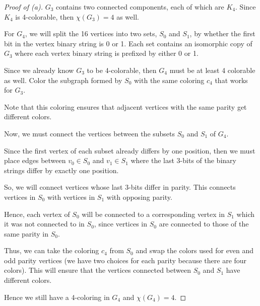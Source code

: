 \documentclass[../hw7]{subfiles}
\begin{document}
\begin{proof}[Proof of (a)]
	$G_3$ contains two connected components, each of which are $K_4$.
	Since $K_4$ is 4-colorable, then $\chi(G_3)=4$ as well.

	For $G_4$, we will split the 16 vertices into two sets, $S_0$ and $S_1$, by whether the first bit in the vertex binary string is 0 or 1.
	Each set contains an isomorphic copy of $G_3$ where each vertex binary string is prefixed by either 0 or 1.

	Since we already know $G_3$ to be 4-colorable, then $G_4$ must be at least 4 colorable as well.
	Color the subgraph formed by $S_0$ with the same coloring $c_4$ that works for $G_3$.

	Note that this coloring ensures that adjacent vertices with the same parity get different colors.

	Now, we must connect the vertices between the subsets $S_0$ and $S_1$ of $G_4$.

	Since the first vertex of each subset already differs by one position,
	then we must place edges between $v_0 \in S_0$ and $v_1 \in  S_1$ where the last 3-bits of the binary strings differ by exactly one position.

	So, we will connect vertices whose last 3-bits differ in parity.
	This connects vertices in $S_0$ with vertices in $S_1$ with opposing parity.

	Hence, each vertex of $S_0$ will be connected to a corresponding vertex in $S_1$ which it was not connected to in $S_0$, since vertices in $S_0$ are connected to those of the same parity in $S_0$.

	Thus, we can take the coloring $c_4$ from  $S_0$ and swap the colors used for even and odd parity vertices (we have two choices for each parity because there are four colors).
	This will ensure that the vertices connected between $S_0$ and $S_1$ have different colors.

	Hence we still have a 4-coloring in $G_4$ and $\chi(G_4)=4$.
\end{proof}
\end{document}
